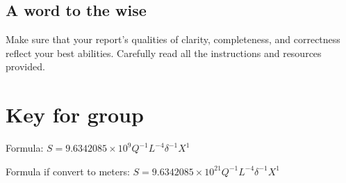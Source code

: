 \documentclass[11pt]{article}\usepackage[]{graphicx}\usepackage[]{color}
\begin{document}
\subsection*{A word to the wise}

Make sure that your report's qualities of clarity, completeness, and
correctness reflect your best abilities. Carefully read all the instructions
and resources provided.


\newpage

\section*{Key for group }



Formula: $S = \ensuremath{9.6342085\times 10^{9}} Q^{-1} L^{-4} \delta^{-1} X^{1}$

Formula if convert to meters: $S = \ensuremath{9.6342085\times 10^{21}} Q^{-1} L^{-4} \delta^{-1} X^{1}$

\end{document}
